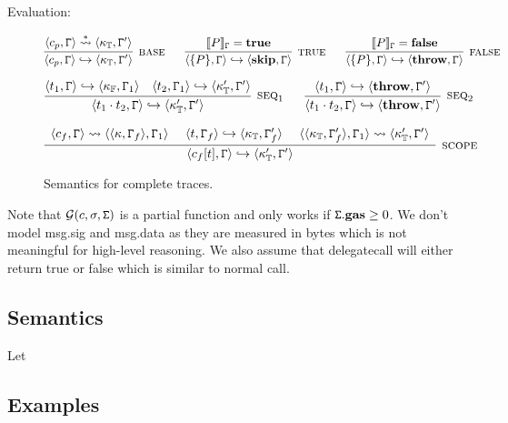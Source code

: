 Evaluation:
\begin{figure}
$$
\infer[\rname{base}]{\conf{c_p,\cstate} \hookrightarrow \conf{\kappa_{\mathbb{T}},\cstate'}}{\conf{c_p,\cstate} \stackrel{*}{\leadsto} \conf{\kappa_{\mathbb{T}},\cstate'}}
~~~~~
\infer[\rname{true}]{\conf{\{P\},\cstate} \hookrightarrow \conf{\textbf{skip},\cstate}}{\eval{P}_\cstate = \textbf{true}}
~~~~~
\infer[\rname{false}]{\conf{\{P\},\cstate} \hookrightarrow \conf{\textbf{throw},\cstate}}{\eval{P}_\cstate = \textbf{false}}
$$

$$
\infer[\rname{seq}_1]{\conf{t_1 \nxt t_2,\cstate} \hookrightarrow \conf{\kappa_{\mathbb{T}}' ,\cstate'}}{\conf{t_1,\cstate} \hookrightarrow \conf{\kappa_{\mathbb{F}},\cstate_1}~~~\conf{t_2,\cstate_1} \hookrightarrow \conf{\kappa_{\mathbb{T}}',\cstate'}}
~~~~~
\infer[\rname{seq}_2]{\conf{t_1 \nxt t_2,\cstate} \hookrightarrow \conf{\textbf{throw} ,\cstate'}}{\conf{t_1,\cstate} \hookrightarrow \conf{\textbf{throw},\cstate'}}
$$

$$
\infer[\rname{scope}]{\conf{c_f[t],\cstate} \hookrightarrow \conf{\kappa'_{\mathbb{T}},\cstate'}}
{
	\begin{array}{c}
	\conf{c_f,\cstate} \leadsto \conf{\conf{\kappa,\cstate_f},\cstate_1}
	~~~~
	\conf{t,\cstate_f} \hookrightarrow \conf{\kappa_{\mathbb{T}},\cstate_f'}
	~~~~
	\conf{\conf{\kappa_{\mathbb{T}},\cstate_f'},\cstate_1} \leadsto \conf{\kappa'_{\mathbb{T}},\cstate'}
	\end{array}
}
$$
\caption{Semantics for complete traces.}\label{fig:tracesem}
\end{figure}



Note that $\mathcal{G}(c,\sigma,\mathtt{\Sigma})$ is a partial function and only works if $\mathtt{\Sigma}.\textbf{gas} \geq 0$. We don't model msg.sig and msg.data as they are measured in bytes which is not meaningful for high-level reasoning. We also assume that delegatecall will either return true or false which is similar to normal call.
\subsection{Semantics}

Let 

\subsection{Examples}